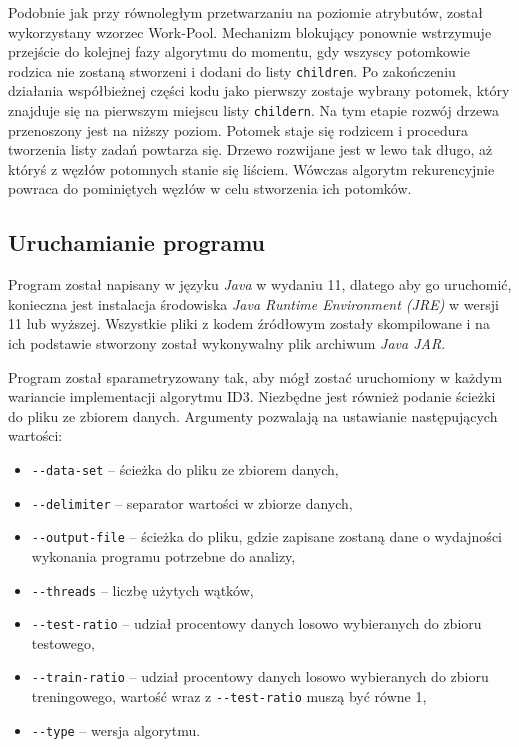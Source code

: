 \documentclass[12pt]{article}
\begin{document}
Podobnie jak przy równoległym przetwarzaniu na poziomie atrybutów, został wykorzystany wzorzec Work-Pool.
Mechanizm blokujący ponownie wstrzymuje przejście do kolejnej fazy algorytmu do momentu, gdy wszyscy potomkowie rodzica nie zostaną stworzeni
i dodani do listy \verb|children|. Po zakończeniu działania współbieżnej części kodu jako pierwszy zostaje wybrany potomek, który znajduje się
na pierwszym miejscu listy \verb|childern|. Na tym etapie rozwój drzewa przenoszony jest na niższy poziom. Potomek staje się rodzicem
i procedura tworzenia listy zadań powtarza się. Drzewo rozwijane jest w lewo tak długo, aż któryś z węzłów potomnych stanie się liściem.
Wówczas algorytm rekurencyjnie powraca do pominiętych węzłów w celu stworzenia ich potomków.

\subsection{Uruchamianie programu}

Program został napisany w języku \textit{Java} w wydaniu 11, dlatego aby go uruchomić, konieczna jest instalacja środowiska \textit{Java Runtime Environment (JRE)}
w wersji 11 lub wyższej. Wszystkie pliki z kodem źródłowym zostały skompilowane i na ich podstawie stworzony został wykonywalny plik archiwum \textit{Java JAR}.

Program został sparametryzowany tak, aby mógł zostać uruchomiony w każdym wariancie implementacji algorytmu ID3. Niezbędne jest również
podanie ścieżki do pliku ze zbiorem danych. Argumenty pozwalają na ustawianie następujących wartości:

{\renewcommand\labelitemi{}
\begin{itemize}
    \item \verb|--data-set| -- ścieżka do pliku ze zbiorem danych,
    \item \verb|--delimiter| -- separator wartości w zbiorze danych,
    \item \verb|--output-file| -- ścieżka do pliku, gdzie zapisane zostaną dane o wydajności wykonania programu potrzebne do analizy,
    \item \verb|--threads| -- liczbę użytych wątków,
    \item \verb|--test-ratio| -- udział procentowy danych losowo wybieranych do zbioru testowego,
    \item \verb|--train-ratio| -- udział procentowy danych losowo wybieranych do zbioru treningowego, wartość wraz z \verb|--test-ratio| muszą być równe 1,
    \item \verb|--type| -- wersja algorytmu.
\end{itemize}}
\end{document}
